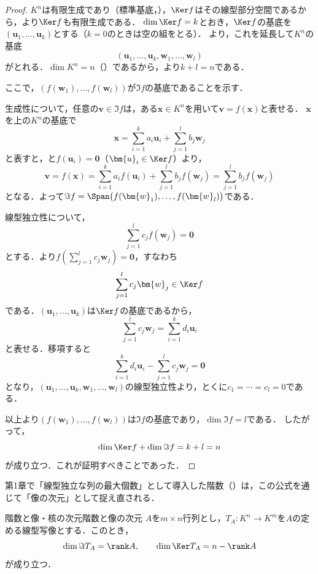 \begin{leftbar}
\begin{proof}
  $K^n$は有限生成であり（標準基底，），$\Ker f$はその線型部分空間であるから，より$\Ker f$も有限生成である．
  $\dim \Ker f = k$とおき，$\Ker f$の基底を$(\bm{u}_1, \dots, \bm{u}_k)$とする（$k = 0$のときは空の組をとる）．
  より，これを延長して$K^n$の基底
  \[
    (\bm{u}_1, \dots, \bm{u}_k, \bm{w}_1, \dots, \bm{w}_l)
  \]
  がとれる．$\dim K^n = n$（）であるから，より$k + l = n$である．

  ここで，$(f(\bm{w}_1), \dots, f(\bm{w}_l))$が$\Im f$の基底であることを示す．

  生成性について，任意の$\bm{v} \in \Im f$は，ある$\bm{x} \in K^n$を用いて$\bm{v} = f(\bm{x})$と表せる．
  $\bm{x}$を上の$K^n$の基底で
  \[
    \bm{x} = \sum_{i=1}^{k} a_i \bm{u}_i + \sum_{j=1}^{l} b_j \bm{w}_j
  \]
  と表すと，と$f(\bm{u}_i) = \bm{0}$（$\bm{u}_i \in \Ker f$）より，
  \[
    \bm{v} = f(\bm{x})
    = \sum_{i=1}^{k} a_i f(\bm{u}_i) + \sum_{j=1}^{l} b_j f(\bm{w}_j)
    = \sum_{j=1}^{l} b_j f(\bm{w}_j)
  \]
  となる．よって$\Im f = \Span\bigl(f(\bm{w}_1), \dots, f(\bm{w}_l)\bigr)$である．

  線型独立性について，
  \[
    \sum_{j=1}^{l} c_j f(\bm{w}_j) = \bm{0}
  \]
  とする．より$f\left(\sum_{j=1}^{l} c_j \bm{w}_j\right) = \bm{0}$，すなわち
  \[
    \sum_{j=1}^{l} c_j \bm{w}_j \in \Ker f
  \]
  である．$(\bm{u}_1, \dots, \bm{u}_k)$は$\Ker f$の基底であるから，
  \[
    \sum_{j=1}^{l} c_j \bm{w}_j = \sum_{i=1}^{k} d_i \bm{u}_i
  \]
  と表せる．移項すると
  \[
    \sum_{i=1}^{k} d_i \bm{u}_i - \sum_{j=1}^{l} c_j \bm{w}_j = \bm{0}
  \]
  となり，$(\bm{u}_1, \dots, \bm{u}_k, \bm{w}_1, \dots, \bm{w}_l)$の線型独立性より，とくに$c_1 = \cdots = c_l = 0$である．

  以上より$(f(\bm{w}_1), \dots, f(\bm{w}_l))$は$\Im f$の基底であり，$\dim \Im f = l$である．
  したがって，
  \[
    \dim \Ker f + \dim \Im f = k + l = n
  \]
  が成り立つ．これが証明すべきことであった．
\end{proof}
\end{leftbar}

第1章で「線型独立な列の最大個数」として導入した階数（）は，この公式を通じて「像の次元」として捉え直される．

\begin{cor}{階数と像・核の次元}{階数と像の次元}
  $A$を$m \times n$行列とし，$T_A \colon K^n \to K^m$を$A$の定める線型写像とする．このとき，
  \[
    \dim \Im T_A = \rank A,
    \qquad
    \dim \Ker T_A = n - \rank A
  \]
  が成り立つ．
\end{cor}

